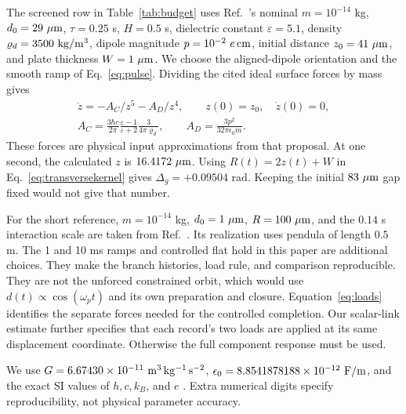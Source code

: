 The screened row in Table~\ref{tab:budget} uses Ref.~\cite{Schut}'s nominal $m=10^{-14}$ kg, $d_0=29\ \mu{\rm m}$, $\tau=0.25$ s, $H=0.5$ s, dielectric constant $\varepsilon=5.1$, density $\varrho_d=3500\ {\rm kg/m^3}$, dipole magnitude $p=10^{-2}\ e\,{\rm cm}$, initial distance $z_0=41\ \mu{\rm m}$, and plate thickness $W=1\ \mu{\rm m}$. We choose the aligned-dipole orientation and the smooth ramp of Eq.~\eqref{eq:pulse}. Dividing the cited ideal surface forces by mass gives
\begin{equation}
\begin{gathered}
\ddot z=-A_C/z^5-A_D/z^4,\qquad z(0)=z_0,\quad\dot z(0)=0,\\
A_C=\frac{3\hbar c}{2\pi}\frac{\varepsilon-1}{\varepsilon+2}\frac3{4\pi\varrho_d},\qquad
A_D=\frac{3p^2}{32\pi\epsilon_0m}.
\end{gathered}
\label{eq:screen}
\end{equation}
These forces are physical input approximations from that proposal. At one second, the calculated $z$ is $16.4172\ \mu{\rm m}$. Using $R(t)=2z(t)+W$ in Eq.~\eqref{eq:transversekernel} gives $\Delta_g=+0.09504$ rad. Keeping the initial $83\ \mu{\rm m}$ gap fixed would not give that number.

For the short reference, $m=10^{-14}$ kg, $d_0=1\ \mu{\rm m}$, $R=100\ \mu{\rm m}$, and the $0.14$ s interaction scale are taken from Ref.~\cite{Williams}. Its realization uses pendula of length $0.5$ m. The 1 and 10 ms ramps and controlled flat hold in this paper are additional choices. They make the branch histories, load rule, and comparison reproducible. They are not the unforced constrained orbit, which would use $d(t)\propto\cos(\omega_p t)$ and its own preparation and closure. Equation~\eqref{eq:loads} identifies the separate forces needed for the controlled completion. Our scalar-link estimate further specifies that each record's two loads are applied at its same displacement coordinate. Otherwise the full component response must be used.

We use $G=6.67430\times10^{-11}\ {\rm m^3\,kg^{-1}\,s^{-2}}$, $\epsilon_0=8.8541878188\times10^{-12}\ {\rm F/m}$, and the exact SI values of $h,c,k_B$, and $e$ \cite{CODATA}. Extra numerical digits specify reproducibility, not physical parameter accuracy.

